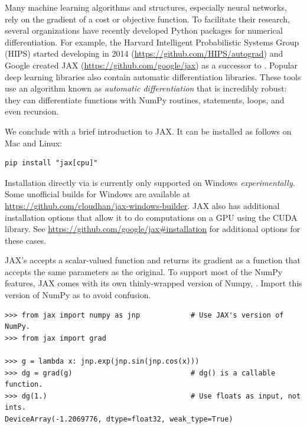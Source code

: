 Many machine learning algorithms and structures, especially neural networks, rely on the gradient of a cost or objective function.
To facilitate their research, several organizations have recently developed Python packages for numerical differentiation.
For example, the Harvard Intelligent Probabilistic Systems Group (HIPS) started developing  in 2014 (\url{https://github.com/HIPS/autograd}) and Google
created JAX (\url{https://github.com/google/jax}) as a successor to .
Popular deep learning libraries also contain automatic differentiation libraries.
These tools use an algorithm known as \emph{automatic differentiation} that is incredibly robust: they can differentiate functions with NumPy routines,  statements,  loops, and even recursion.

We conclude with a brief introduction to JAX.
It can be installed as follows on Mac and Linux:
\begin{lstlisting}
pip install "jax[cpu]"
\end{lstlisting}
Installation directly via  is currently only supported on Windows \emph{experimentally}.
Some unofficial builds for Windows are available at \url{https://github.com/cloudhan/jax-windows-builder}.
JAX also has additional installation options that allow it to do computations on a GPU using the CUDA library.
See \url{https://github.com/google/jax#installation} for additional options for these cases.


JAX's  accepts a scalar-valued function and returns its gradient as a function that accepts the same parameters as the original.
To support most of the NumPy features, JAX comes with its own thinly-wrapped version of Numpy, .
Import this version of NumPy as  to avoid confusion.

\begin{lstlisting}
>>> from jax import numpy as jnp            # Use JAX's version of NumPy.
>>> from jax import grad

>>> g = lambda x: jnp.exp(jnp.sin(jnp.cos(x)))
>>> dg = grad(g)                            # dg() is a callable function.
>>> dg(1.)                                  # Use floats as input, not ints.
DeviceArray(-1.2069776, dtype=float32, weak_type=True)
\end{lstlisting}

